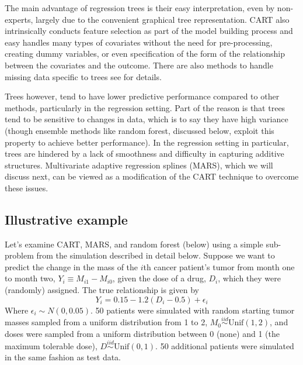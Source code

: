 \documentclass[12pt]{article}
\begin{document}
The main advantage of regression trees is their easy interpretation, even by non-experts, largely due to the convenient graphical tree representation. CART also intrinsically conducts feature selection as part of the model building process and easy handles many types of covariates without the need for pre-processing, creating dummy variables, or even specification of the form of the relationship between the covariates and the outcome. There are also methods to handle missing data specific to trees see \textcite{esl} for details.

Trees however, tend to have lower predictive performance compared to other methods, particularly in the regression setting. Part of the reason is that trees tend to be sensitive to changes in data, which is to say they have high variance (though ensemble methods like random forest, discussed below, exploit this property to achieve better performance). In the regression setting in particular, trees are hindered by a lack of smoothness and difficulty in capturing additive structures. Multivariate adaptive regression splines (MARS), which we will discuss next, can be viewed as a modification of the CART technique to overcome these issues.


\subsection{Illustrative example} %
\label{sub:example}

Let's examine CART, MARS, and random forest (below) using a simple sub-problem from the simulation described in detail below. Suppose we want to predict the change in the mass of the $i$th cancer patient's tumor from month one to month two, $Y_{i} \equiv M_{i1} - M_{i0}$, given the dose of a drug, $D_{i}$, which they were (randomly) assigned. The true relationship is given by
\begin{equation}
  Y_{i} = 0.15 - 1.2 (D_{i} - 0.5) + \epsilon_{i} 
\end{equation}
Where $\epsilon_{i} \sim N(0, 0.05)$. 50 patients were simulated with random starting tumor masses sampled from a uniform distribution from 1 to 2, $M_{0} \overset{iid}{\sim} \text{Unif}(1, 2)$, and doses were sampled from a uniform distribution between 0 (none) and 1 (the maximum tolerable dose), $D \overset{iid}{\sim} \text{Unif}(0, 1)$. 50 additional patients were simulated in the same fashion as test data. 
\end{document}
